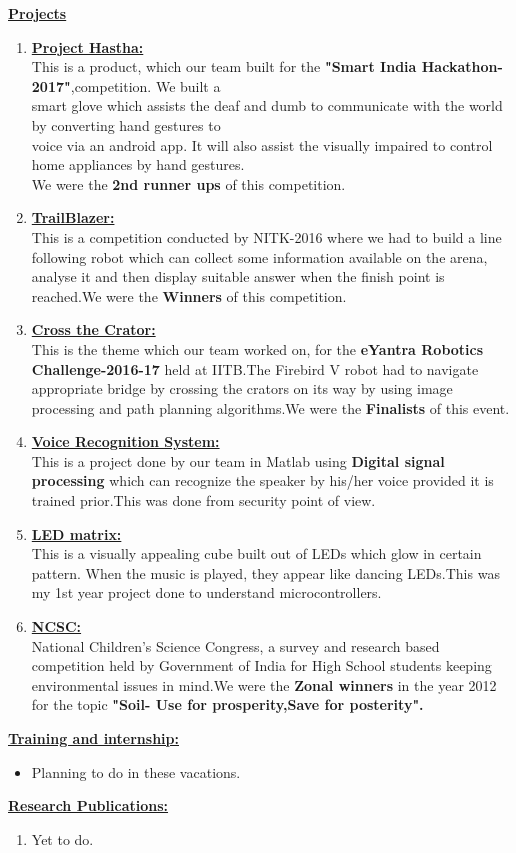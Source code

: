 \documentclass[10pt]{article}
\begin{document}
\underline{\textbf{\Large{Projects}}}
\begin{enumerate}
	\item{\underline{\textbf{\large{Project Hastha:}}}\\ 
		This is a product, which our team built for the \textbf{"Smart India Hackathon-2017"},competition. We built a\\ smart glove which assists the deaf and dumb to communicate with the world by converting hand gestures to\\ voice via an android app. It will also assist the visually impaired to control home appliances by hand gestures.\\We were the \textbf{2nd runner ups} of this competition.}
	\item{\underline{\textbf{\large{TrailBlazer:}}}\\
		This is a competition conducted by NITK-2016 where we had to build a line following robot which can collect some information available on the arena, analyse it and then display suitable answer when the finish point is reached.We were the \textbf{Winners} of this competition. }
	\item{\underline{\textbf{\large{Cross the Crator:}}}\\ This is the theme which our team worked on, for the \textbf{eYantra Robotics Challenge-2016-17} held at IITB.The Firebird V robot had to navigate appropriate bridge by crossing the crators on its way by using image processing and path planning algorithms.We were the \textbf{Finalists} of this event.  }
	\item{\underline{\textbf{\large{Voice Recognition System:}}}\\This is a project done by our team in Matlab using \textbf{Digital signal processing} which can recognize the speaker by his/her voice provided it is trained prior.This was done from security point of view. }
	\item{\underline{\textbf{\large{LED matrix:}}} \\This is a visually appealing cube built out of LEDs which glow in certain pattern. When the music is played, they appear like dancing LEDs.This was my 1st year project done to understand microcontrollers. }
	\item{\underline{\textbf{\large{NCSC:}}} \\National Children's Science Congress, a survey and research based competition held by Government of India for High School students keeping environmental issues in mind.We were the \textbf{Zonal winners} in the year 2012 for the topic \textbf{"Soil- Use for prosperity,Save for posterity".}} 
\end{enumerate}
\hfill

\underline{\textbf{\Large{Training and internship:}}}
\begin{itemize}
	\item{Planning to do in these vacations.}	
\end{itemize}
\hfill

\underline{\textbf{\Large{Research Publications:}}}
\begin{enumerate}
	\item{Yet to do.}	
\end{enumerate}
\hfill
\end{document}
